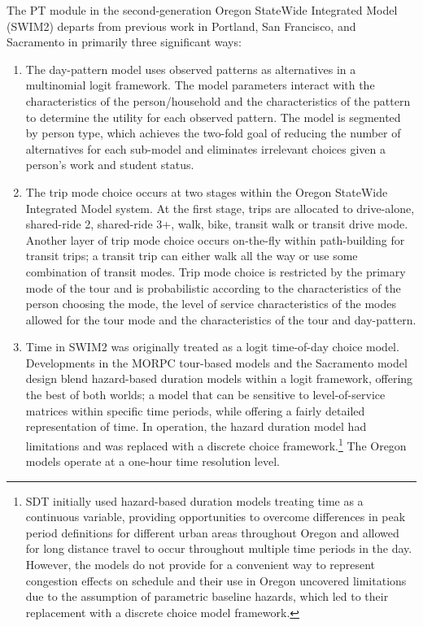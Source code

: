 The PT module in the second-generation Oregon StateWide Integrated Model (SWIM2) departs from previous work in Portland, San Francisco, and Sacramento in primarily three significant ways:
\begin{enumerate}
\item The day-pattern model uses observed patterns as alternatives in a multinomial logit framework. The model parameters interact with the characteristics of the person/household and the characteristics of the pattern to determine the utility for each observed pattern. The model is segmented by person type, which achieves the two-fold goal of reducing the number of alternatives for each sub-model and eliminates irrelevant choices given a person's work and student status. 
\item The trip mode choice occurs at two stages within the Oregon StateWide Integrated Model system. At the first stage, trips are allocated to drive-alone, shared-ride 2, shared-ride 3+, walk, bike, transit walk or transit drive mode. Another layer of trip mode choice occurs on-the-fly within path-building for transit trips; a transit trip can either walk all the way or use some combination of transit modes. Trip mode choice is restricted by the primary mode of the tour and is probabilistic according to the characteristics of the person choosing the mode, the level of service characteristics of the modes allowed for the tour mode and the characteristics of the tour and day-pattern.
\item Time in SWIM2 was originally treated as a logit time-of-day choice model. Developments in the MORPC tour-based models and the Sacramento model design blend hazard-based duration models within a logit framework, offering the best of both worlds; a model that can be sensitive to level-of-service matrices within specific time periods, while offering a fairly detailed representation of time. In operation, the hazard duration model had limitations and was replaced with a discrete choice framework.\footnote{SDT initially used hazard-based duration models treating time as a continuous variable, providing opportunities to overcome differences in peak period definitions for different urban areas throughout Oregon and allowed for long distance travel to occur throughout multiple time periods in the day. However, the models do not provide for a convenient way to represent congestion effects on schedule and their use in Oregon uncovered limitations due to the assumption of parametric baseline hazards, which led to their replacement with a discrete choice model framework.} The Oregon models operate at a one-hour time resolution level.
\end{enumerate}

